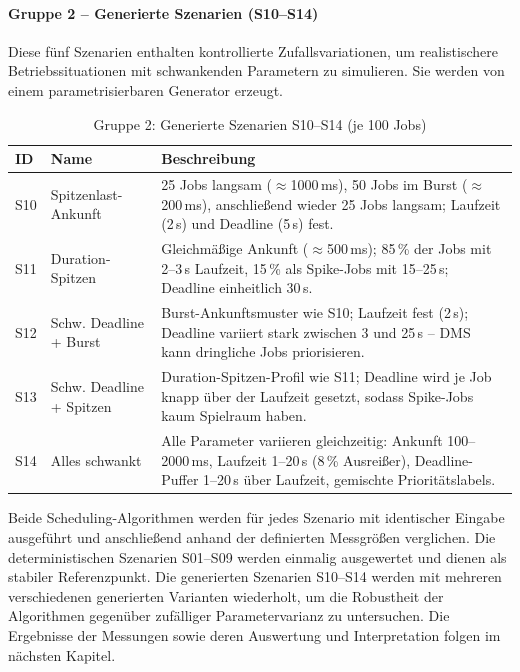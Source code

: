 \documentclass[
    12pt,               
    a4paper,            
    ngerman,            
    parskip=half,       
    headings=normal,   
    numbers=enddot,     
    toc=chapterentrywithdots 
]{scrreprt}\usepackage[utf8]{inputenc}
\begin{document}
\paragraph{Gruppe 2 -- Generierte Szenarien (S10--S14)}
Diese fünf Szenarien enthalten kontrollierte Zufallsvariationen, um realistischere Betriebssituationen mit schwankenden Parametern zu simulieren. Sie werden von einem parametrisierbaren Generator erzeugt.

\begin{table}[H]
\centering
{\setlength{\arrayrulewidth}{0.3pt}
\begin{tabular}{|p{}|p{}|p{}|}
    \hline
    \textbf{ID} & \textbf{Name} & \textbf{Beschreibung} \\
    \hline
    S10 & Spitzenlast-Ankunft & 25 Jobs langsam ($\approx$1000\,ms), 50 Jobs im Burst ($\approx$200\,ms), anschließend wieder 25 Jobs langsam; Laufzeit (2\,s) und Deadline (5\,s) fest. \\
    \hline
    S11 & Duration-Spitzen & Gleichmäßige Ankunft ($\approx$500\,ms); 85\,\% der Jobs mit 2--3\,s Laufzeit, 15\,\% als Spike-Jobs mit 15--25\,s; Deadline einheitlich 30\,s. \\
    \hline
    S12 & Schw. Deadline + Burst & Burst-Ankunftsmuster wie S10; Laufzeit fest (2\,s); Deadline variiert stark zwischen 3 und 25\,s -- DMS kann dringliche Jobs priorisieren. \\
    \hline
    S13 & Schw. Deadline + Spitzen & Duration-Spitzen-Profil wie S11; Deadline wird je Job knapp über der Laufzeit gesetzt, sodass Spike-Jobs kaum Spielraum haben. \\
    \hline
    S14 & Alles schwankt & Alle Parameter variieren gleichzeitig: Ankunft 100--2000\,ms, Laufzeit 1--20\,s (8\,\% Ausreißer), Deadline-Puffer 1--20\,s über Laufzeit, gemischte Prioritätslabels. \\
    \hline
\end{tabular}}
\caption{Gruppe 2: Generierte Szenarien S10--S14 (je 100 Jobs)}
\label{tab:szenarien_s10_s14}
\end{table}

Beide Scheduling-Algorithmen werden für jedes Szenario mit identischer Eingabe ausgeführt und anschließend anhand der definierten Messgrößen verglichen. Die deterministischen Szenarien S01--S09 werden einmalig ausgewertet und dienen als stabiler Referenzpunkt. Die generierten Szenarien S10--S14 werden mit mehreren verschiedenen generierten Varianten wiederholt, um die Robustheit der Algorithmen gegenüber zufälliger Parametervarianz zu untersuchen. Die Ergebnisse der Messungen sowie deren Auswertung und Interpretation folgen im nächsten Kapitel.
\end{document}
